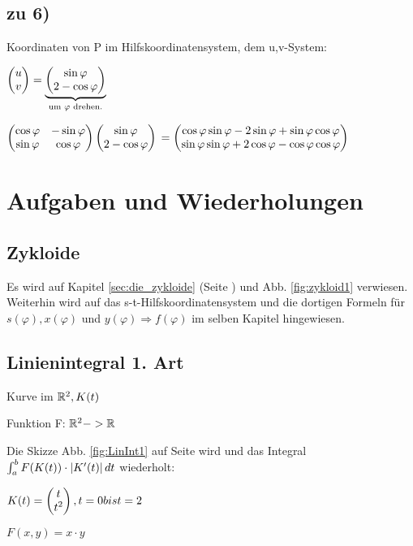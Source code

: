 \subsection{zu 6)}
\renewcommand{\ldate}{2016-01-16}
Koordinaten von P im Hilfskoordinatensystem, dem u,v-System: 

$  \begin{pmatrix} u\\v \end{pmatrix}  = \underbrace{ \begin{pmatrix} \sin \varphi\\2 - \cos \varphi \end{pmatrix} }_{\textrm{um } \varphi \textrm{ drehen.}} $

$  \begin{pmatrix} \cos \varphi & -\sin \varphi\\\sin \varphi & \cos \varphi \end{pmatrix}   \begin{pmatrix} \sin \varphi\\2-\cos \varphi \end{pmatrix}  $
$= \begin{pmatrix} \cos \varphi \sin \varphi - 2 \sin \varphi + \sin \varphi \cos \varphi\\\sin \varphi \sin \varphi + 2 \cos \varphi - \cos \varphi \cos \varphi  \end{pmatrix}  $

\section{Aufgaben und Wiederholungen}

\subsection{Zykloide}
Es wird auf Kapitel \ref{sec:die_zykloide} (Seite \pageref{sec:die_zykloide}) und Abb. \ref{fig:zykloid1} verwiesen. Weiterhin wird auf das s-t-Hilfskoordinatensystem und die dortigen Formeln für $ s(\varphi), x(\varphi) $ und $ y(\varphi) \Rightarrow f(\varphi) $ im selben Kapitel hingewiesen. 

\subsection{Linienintegral 1. Art}
Kurve im $\mathbb{R}^2, K(t)$

Funktion F: $\mathbb{R}^2 -> \mathbb{R}$

Die Skizze Abb. \ref{fig:LinInt1} auf Seite \pageref{fig:LinInt1} wird und das Integral $\int_{a}^{b} F(K(t)) \cdot  \left\vert K'(t) \right\vert  dt$ wiederholt:

$ K(t) =  \begin{pmatrix} t\\t^2 \end{pmatrix} , t=0 bis t = 2 $

$ F(x,y) = x\cdot y $

